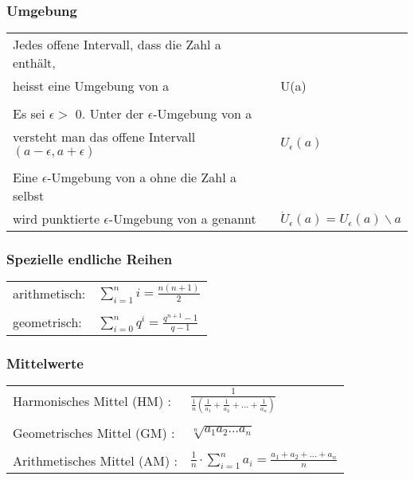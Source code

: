 \subsubsection{Umgebung}
    \begin{tabular}{ll} 
        Jedes offene Intervall, dass die Zahl a enthält, & \\ 
        heisst eine Umgebung von a                       &  U(a)\\
        \\
        Es sei $\epsilon >$ 0. Unter der $\epsilon$-Umgebung von a & \\ 
        versteht man das offene Intervall $(a-\epsilon,a+\epsilon)$ &  $U_\epsilon(a)$\\ 
        \\
        Eine $\epsilon$-Umgebung von a ohne die Zahl a selbst & \\ 
        wird punktierte $\epsilon$-Umgebung von a genannt & $\dot{U}_\epsilon(a)=U_\epsilon(a)\smallsetminus{a}$ \\ 
    \end{tabular}
    
\subsubsection{Spezielle endliche Reihen}
    \begin{tabular}{ll} 
        arithmetisch: & $\sum\limits _{i=1}^n i = \frac{n(n+1)}{2}$ \\
        \\
        geometrisch: & $\sum\limits _{i=0}^n q^i = \frac{q^{n+1} - 1}{q - 1}$ \\
    \end{tabular}
        
\subsubsection{Mittelwerte}
    \begin{tabular}{ll} 
        Harmonisches Mittel (HM) : &  $\frac{1}{\frac{1}{n}(\frac{1}{a_1}+\frac{1}{a_2}+...+\frac{1}{a_n})}$ \\
        \\
        Geometrisches Mittel (GM) : & $\sqrt[n]{a_1 a_2 \ldots a_n}$ \\
        \\
        Arithmetisches Mittel (AM) : & $\frac{1}{n} \cdot \sum\limits _{i=1}^n a_i = 	\frac{a_1+a_2+...+a_n}{n}$ \\
    \end{tabular}
    
